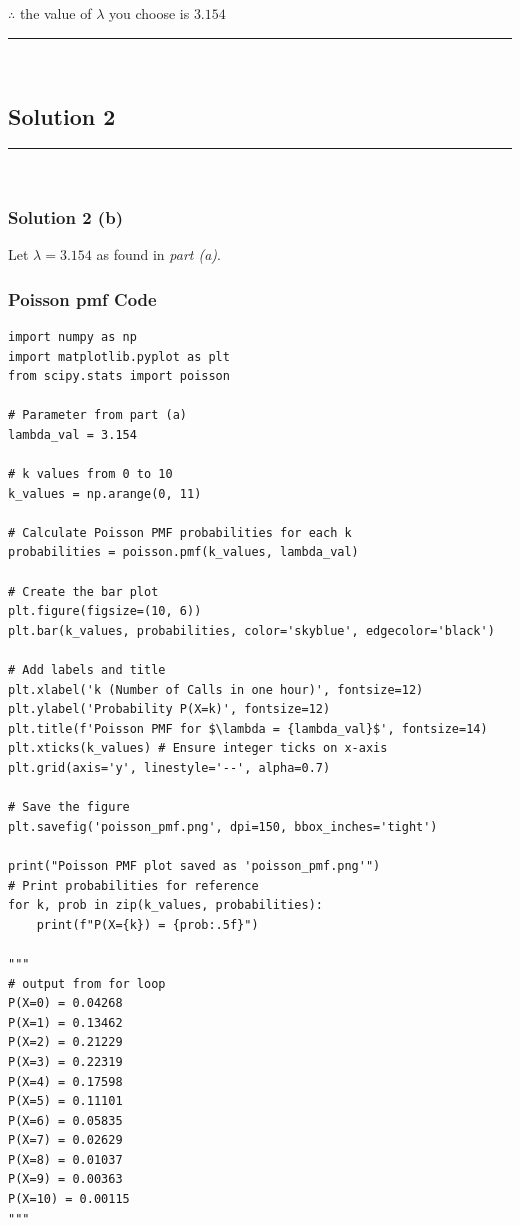\documentclass{article}
\begin{document}
\subsubsection*{\normalfont}{$\therefore$ the value of $\lambda$ you choose is $3.154$}\\

\noindent\rule{\textwidth}{0.4pt}\\

\newpage

\subsection*{Solution 2}
\noindent\rule{\textwidth}{0.4pt}\\
\subsubsection*{Solution 2 (b)}
Let $\lambda = 3.154$ as found in \textit{part (a)}.

\subsubsection*{Poisson pmf Code}
\begin{lstlisting}
import numpy as np
import matplotlib.pyplot as plt
from scipy.stats import poisson

# Parameter from part (a)
lambda_val = 3.154

# k values from 0 to 10
k_values = np.arange(0, 11)

# Calculate Poisson PMF probabilities for each k
probabilities = poisson.pmf(k_values, lambda_val)

# Create the bar plot
plt.figure(figsize=(10, 6))
plt.bar(k_values, probabilities, color='skyblue', edgecolor='black')

# Add labels and title
plt.xlabel('k (Number of Calls in one hour)', fontsize=12)
plt.ylabel('Probability P(X=k)', fontsize=12)
plt.title(f'Poisson PMF for $\lambda = {lambda_val}$', fontsize=14)
plt.xticks(k_values) # Ensure integer ticks on x-axis
plt.grid(axis='y', linestyle='--', alpha=0.7)

# Save the figure
plt.savefig('poisson_pmf.png', dpi=150, bbox_inches='tight')

print("Poisson PMF plot saved as 'poisson_pmf.png'")
# Print probabilities for reference
for k, prob in zip(k_values, probabilities):
    print(f"P(X={k}) = {prob:.5f}")

"""
# output from for loop
P(X=0) = 0.04268
P(X=1) = 0.13462
P(X=2) = 0.21229
P(X=3) = 0.22319
P(X=4) = 0.17598
P(X=5) = 0.11101
P(X=6) = 0.05835
P(X=7) = 0.02629
P(X=8) = 0.01037
P(X=9) = 0.00363
P(X=10) = 0.00115
"""
\end{lstlisting}
\end{document}
